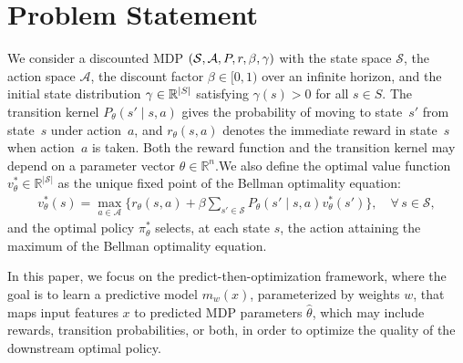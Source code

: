 \section{Problem Statement}
We consider a discounted MDP $({\mathcal{S}}, {\mathcal{A}}, P, r, \beta, \gamma)$ with the state space $\mathcal{S}$, the action space $\mathcal{A}$, the discount factor $\beta \in [0,1)$ over an infinite horizon, and the initial state distribution $\gamma \in \mathbb{R}^{|S|}$ satisfying $\gamma(s) > 0$ for all $s \in S$. The transition kernel $P_\theta(s' \mid s, a)$ gives
the probability of moving to state~$s'$ from state~$s$ under action~$a$,
and $r_\theta(s,a)$ denotes the immediate reward in state~$s$ when action~$a$
is taken. Both the reward function and the transition kernel may depend on a
parameter vector $\theta \in \mathbb{R}^n$.We also define the optimal value function
$v^*_\theta \in \mathbb{R}^{|\mathcal{S}|}$ as the unique fixed point of the
Bellman optimality equation:
\begin{align*}
    v^*_\theta(s)
    = \max_{a \in \mathcal{A}} \{
        r_\theta(s,a) + \beta \sum_{s' \in \mathcal{S}}
          P_\theta(s' \mid s, a) v^*_\theta(s')\},
    \quad \forall\, s \in \mathcal{S},
\end{align*}
and the optimal policy $\pi^*_\theta$ selects, at each state $s$, the action attaining the maximum of the Bellman optimality equation.

In this paper, we focus on the predict-then-optimization framework, where the goal is to learn a predictive model $m_{w}(x)$, parameterized by weights $w$, that maps input features $x$ to predicted MDP parameters $\hat{\theta}$, which may include rewards, transition probabilities, or both, in order to optimize the quality of the downstream optimal policy. 

